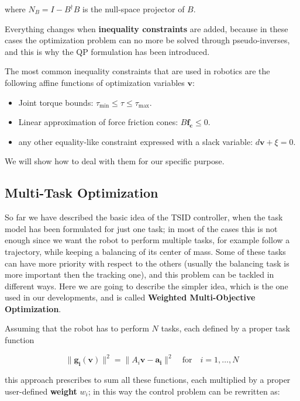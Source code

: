 where $N_B = I - B^{\dagger}B$ is the null-space projector of $B$.

Everything changes when \textbf{inequality constraints} are added, because in these cases the optimization problem can no more be solved through pseudo-inverses, and this is why the QP formulation has been introduced.

The most common inequality constraints that are used in robotics are the following affine functions of optimization variables $\mathbf{v}$:

\begin{itemize}
    \item Joint torque bounds: $\tau_{\min} \leq \tau \leq \tau_{\max}$.
    \item Linear approximation of force friction cones: $B\mathbf{f_c} \leq 0$.
    \item any other equality-like constraint expressed with a slack variable: $d\mathbf{v} + \xi = 0$.
\end{itemize}

We will show how to deal with them for our specific purpose.

\subsection{Multi-Task Optimization}
\label{subsec:Multi-Task Optimization}

So far we have described the basic idea of the TSID controller, when the task model has been formulated for just one task; in most of the cases this is not enough since we want the robot to perform multiple tasks, for example follow a trajectory, while keeping a balancing of its center of mass.
Some of these tasks can have more priority with respect to the others (usually the balancing task is more important then the tracking one), and this problem can be tackled in different ways.
Here we are going to describe the simpler idea, which is the one used in our developments, and is called \textbf{Weighted Multi-Objective Optimization}.

Assuming that the robot has to perform $N$ tasks, each defined by a proper task function

$$
\|\mathbf{g_{i}}(\mathbf{v})\|^{2} = \| A_{i}\mathbf{v} - \mathbf{a_{i}}\|^{2} \quad \text{for} \quad i = 1, \ldots, N
$$

this approach prescribes to sum all these functions, each multiplied by a proper user-defined \textbf{weight} $w_{i}$; in this way the control problem can be rewritten as:

